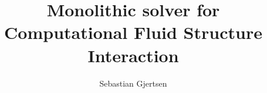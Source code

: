 \documentclass[a4paper, twoside,openright ,titlepage, 12pt]{report}
\title{Monolithic solver for Computational Fluid Structure Interaction}
\subtitle{}
\author{Sebastian Gjertsen}
\begin{document}
\masterfrontpage


\tableofcontents

\cleardoublepage %


	




%
%

%

%

%

\begin{appendices}

\end{appendices}
%




\end{document}
